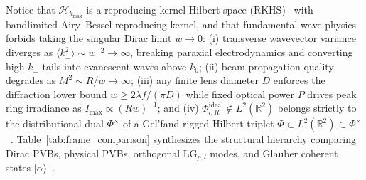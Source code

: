\documentclass[aps,pra,onecolumn,notitlepage,11pt,tightenlines,nofootinbib,floatfix,longbibliography]{revtex4-2}
\theoremstyle{remark}
\newcommand{\ket}[1]{| #1 \rangle}
\begin{document}
Notice that $\mathcal{H}_{k_{\max}}$ is a reproducing-kernel Hilbert space (RKHS)~\cite{PaulsenRaghupathi2016} with bandlimited Airy--Bessel reproducing kernel, and that fundamental wave physics forbids taking the singular Dirac limit $w \to 0$: (i) transverse wavevector variance diverges as $\langle k_\perp^2 \rangle \sim w^{-2} \to \infty$, breaking paraxial electrodynamics and converting high-$k_\perp$ tails into evanescent waves above $k_0$; (ii) beam propagation quality degrades as $M^2 \sim R/w \to \infty$; (iii) any finite lens diameter $D$ enforces the diffraction lower bound $w \ge 2\lambda f/(\pi D)$ while fixed optical power $P$ drives peak ring irradiance as $I_{\max} \propto (R w)^{-1}$; and (iv) $\Phi_{l,R}^{\mathrm{ideal}} \notin L^2(\mathbb{R}^2)$ belongs strictly to the distributional dual $\Phi^\times$ of a Gel'fand rigged Hilbert triplet $\Phi \subset L^2(\mathbb{R}^2) \subset \Phi^\times$~\cite{Gelfand1964}. Table~\ref{tab:frame_comparison} synthesizes the structural hierarchy comparing Dirac PVBs, physical PVBs, orthogonal $\mathrm{LG}_{p,l}$ modes, and Glauber coherent states $\ket{\alpha}$~\cite{Klauder1985,Perelomov1986,Gazeau2009}.
\end{document}
